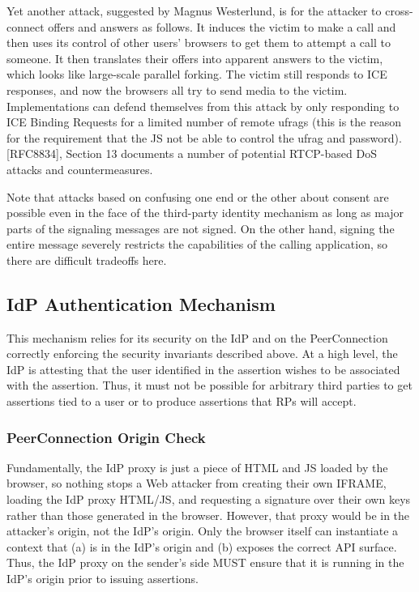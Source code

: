 \documentclass{article}
\begin{document}
Yet another attack, suggested by Magnus Westerlund, is for the
attacker to cross-connect offers and answers as follows.  It induces
the victim to make a call and then uses its control of other users'
browsers to get them to attempt a call to someone.  It then
translates their offers into apparent answers to the victim, which
looks like large-scale parallel forking.  The victim still responds
to ICE responses, and now the browsers all try to send media to the
victim.  Implementations can defend themselves from this attack by
only responding to ICE Binding Requests for a limited number of
remote ufrags (this is the reason for the requirement that the JS not
be able to control the ufrag and password).  [RFC8834], Section 13
documents a number of potential RTCP-based DoS attacks and
countermeasures.

Note that attacks based on confusing one end or the other about
consent are possible even in the face of the third-party identity
mechanism as long as major parts of the signaling messages are not
signed.  On the other hand, signing the entire message severely
restricts the capabilities of the calling application, so there are
difficult tradeoffs here.

\subsection{IdP Authentication Mechanism}

This mechanism relies for its security on the IdP and on the
PeerConnection correctly enforcing the security invariants described
above.  At a high level, the IdP is attesting that the user
identified in the assertion wishes to be associated with the
assertion.  Thus, it must not be possible for arbitrary third parties
to get assertions tied to a user or to produce assertions that RPs
will accept.

\subsubsection{PeerConnection Origin Check}

Fundamentally, the IdP proxy is just a piece of HTML and JS loaded by
the browser, so nothing stops a Web attacker from creating their own
IFRAME, loading the IdP proxy HTML/JS, and requesting a signature
over their own keys rather than those generated in the browser.
However, that proxy would be in the attacker's origin, not the IdP's
origin.  Only the browser itself can instantiate a context that
(a) is in the IdP's origin and (b) exposes the correct API surface.
Thus, the IdP proxy on the sender's side MUST ensure that it is
running in the IdP's origin prior to issuing assertions.
\end{document}
